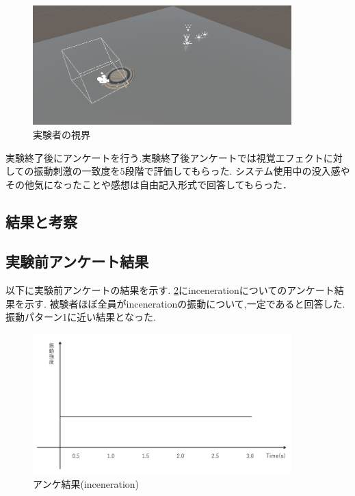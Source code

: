 \begin{figure}[h]
\centering
\includegraphics[clip,width=10cm]{./fig/unity_first.png}
\caption{実験者の視界}\label{first}
\end{figure}

実験終了後にアンケートを行う.実験終了後アンケートでは視覚エフェクトに対しての振動刺激の一致度を5段階で評価してもらった.
システム使用中の没入感やその他気になったことや感想は自由記入形式で回答してもらった．

\newpage

\subsection{結果と考察}
\subsection{実験前アンケート結果}
以下に実験前アンケートの結果を示す.
\ref{inceA}にincenerationについてのアンケート結果を示す.
被験者ほぼ全員がincenerationの振動について,一定であると回答した.
振動パターン1に近い結果となった.
\begin{figure}[h]
\centering
\includegraphics[clip,width=10cm]{fig/incenerationAve.png}
\caption{アンケ結果(inceneration)}\label{inceA}
\end{figure}


